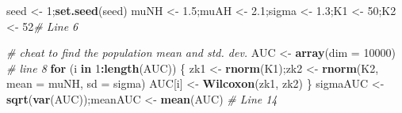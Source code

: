 \documentclass[
]{book}
\newenvironment{Shaded}{\begin{snugshade}}{\end{snugshade}}
\newcommand{\CommentTok}[1]{\textcolor[rgb]{0.56,0.35,0.01}{\textit{#1}}}
\newcommand{\ControlFlowTok}[1]{\textcolor[rgb]{0.13,0.29,0.53}{\textbf{#1}}}
\newcommand{\DataTypeTok}[1]{\textcolor[rgb]{0.13,0.29,0.53}{#1}}
\newcommand{\DecValTok}[1]{\textcolor[rgb]{0.00,0.00,0.81}{#1}}
\newcommand{\FloatTok}[1]{\textcolor[rgb]{0.00,0.00,0.81}{#1}}
\newcommand{\KeywordTok}[1]{\textcolor[rgb]{0.13,0.29,0.53}{\textbf{#1}}}
\newcommand{\NormalTok}[1]{#1}
\newcommand{\OperatorTok}[1]{\textcolor[rgb]{0.81,0.36,0.00}{\textbf{#1}}}
\newcommand{\StringTok}[1]{\textcolor[rgb]{0.31,0.60,0.02}{#1}}
\begin{document}
\begin{Shaded}
\begin{Highlighting}[]
\NormalTok{seed <-}\StringTok{ }\DecValTok{1}\NormalTok{;}\KeywordTok{set.seed}\NormalTok{(seed)}
\NormalTok{muNH <-}\StringTok{ }\FloatTok{1.5}\NormalTok{;muAH <-}\StringTok{ }\FloatTok{2.1}\NormalTok{;sigma <-}\StringTok{ }\FloatTok{1.3}\NormalTok{;K1 <-}\StringTok{ }\DecValTok{50}\NormalTok{;K2 <-}\StringTok{ }\DecValTok{52}\CommentTok{# Line 6}

\CommentTok{# cheat to find the population mean and std. dev.}
\NormalTok{AUC <-}\StringTok{ }\KeywordTok{array}\NormalTok{(}\DataTypeTok{dim =} \DecValTok{10000}\NormalTok{) }\CommentTok{# line 8}
\ControlFlowTok{for}\NormalTok{ (i }\ControlFlowTok{in} \DecValTok{1}\OperatorTok{:}\KeywordTok{length}\NormalTok{(AUC)) \{}
\NormalTok{  zk1 <-}\StringTok{ }\KeywordTok{rnorm}\NormalTok{(K1);zk2 <-}\StringTok{ }\KeywordTok{rnorm}\NormalTok{(K2, }\DataTypeTok{mean =}\NormalTok{ muNH, }\DataTypeTok{sd =}\NormalTok{ sigma)  }
\NormalTok{  AUC[i] <-}\StringTok{ }\KeywordTok{Wilcoxon}\NormalTok{(zk1, zk2)}
\NormalTok{\}}
\NormalTok{sigmaAUC <-}\StringTok{ }\KeywordTok{sqrt}\NormalTok{(}\KeywordTok{var}\NormalTok{(AUC));meanAUC <-}\StringTok{ }\KeywordTok{mean}\NormalTok{(AUC) }\CommentTok{# Line 14}


\end{Highlighting}
\end{Shaded}
\end{document}

